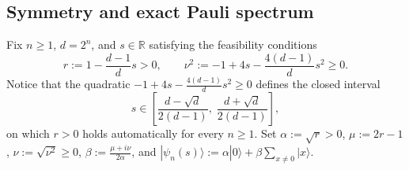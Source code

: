 \documentclass[11pt,a4paper]{article}
\theoremstyle{plain}
\theoremstyle{definition}
\theoremstyle{remark}
\newcommand{\R}{\mathbb{R}}
\newcommand{\ket}[1]{|#1\rangle}
\numberwithin{equation}{section}
\begin{document}
\subsection{Symmetry and exact Pauli spectrum}

Fix $n \ge 1$, $d = 2^n$, and $s \in \R$ satisfying the feasibility conditions
\begin{equation}\label{eq:spike-feasible}
  r := 1 - \frac{d-1}{d}s > 0, \qquad
  \nu^2 := -1 + 4s - \frac{4(d-1)}{d}s^2 \ge 0.
\end{equation}
Notice that the quadratic $-1 + 4s - \frac{4(d-1)}{d}s^2 \ge 0$ defines the closed interval
\[
  s \in \left[\frac{d - \sqrt{d}}{2(d - 1)},\; \frac{d + \sqrt{d}}{2(d - 1)}\right],
\]
on which $r > 0$ holds automatically for every $n \ge 1$. Set $\alpha := \sqrt{r} > 0$, $\mu := 2r - 1$, $\nu := \sqrt{\nu^2} \ge 0$, $\beta := \frac{\mu + i\nu}{2\alpha}$, and $\ket{\psi_n(s)} := \alpha\ket{0} + \beta \sum_{x \neq 0}\ket{x}$.
\end{document}
